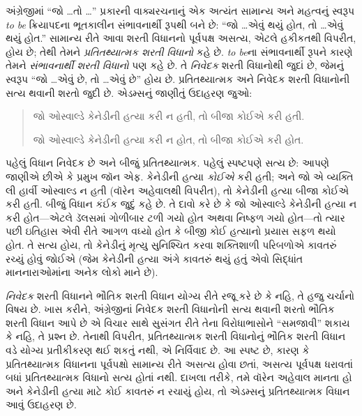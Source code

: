 \begingroup
\makeatletter{}\makeatother


\label{guunit:OLP-0521}


અંગ્રેજીમાં ``જો \dots તો \dots'' પ્રકારની વાક્યરચનાનું એક અત્યંત
સામાન્ય અને મહત્વનું સ્વરૂપ \emph{to be} ક્રિયાપદના ભૂતકાલીન
સંભાવનાર્થી રૂપથી બને છે: ``જો \dots એવું થયું હોત, તો \dots એવું
થયું હોત.'' સામાન્ય રીતે આવા શરતી વિધાનનો પૂર્વપક્ષ અસત્ય, એટલે
હકીકતથી વિપરીત, હોય છે; તેથી તેમને \emph{પ્રતિતથ્યાત્મક શરતી
  વિધાનો} કહે છે. \emph{to be}ના સંભાવનાર્થી રૂપને કારણે તેમને
\emph{સંભાવનાર્થી શરતી વિધાનો} પણ કહે છે. તે \emph{નિવેદક} શરતી
વિધાનોથી જુદાં છે, જેમનું સ્વરૂપ ``જો \dots એવું છે, તો \dots એવું
છે'' હોય છે. પ્રતિતથ્યાત્મક અને નિવેદક શરતી વિધાનોની સત્ય થવાની
શરતો જુદી છે. એડમ્સનું જાણીતું ઉદાહરણ જુઓ:
\begin{quote}
  જો ઓસ્વાલ્ડે કેનેડીની હત્યા કરી ન હતી, તો બીજા કોઈએ કરી હતી.
  
  જો ઓસ્વાલ્ડે કેનેડીની હત્યા કરી ન હોત, તો બીજા કોઈએ કરી હોત.
\end{quote}
પહેલું વિધાન નિવેદક છે અને બીજું પ્રતિતથ્યાત્મક. પહેલું સ્પષ્ટપણે
સત્ય છે: આપણે જાણીએ છીએ કે પ્રમુખ જૉન એફ. કેનેડીની હત્યા
\emph{કોઈએ} કરી હતી; અને જો એ વ્યક્તિ લી હાર્વી ઓસ્વાલ્ડ ન હતી
(વૉરેન અહેવાલથી વિપરીત), તો કેનેડીની હત્યા બીજા કોઈએ કરી હતી. બીજું
વિધાન કંઈક જુદું કહે છે. તે દાવો કરે છે કે જો ઓસ્વાલ્ડે કેનેડીની હત્યા
ન કરી હોત---એટલે ડૅલસમાં ગોળીબાર ટળી ગયો હોત અથવા નિષ્ફળ ગયો
હોત---તો ત્યાર પછી ઇતિહાસ એવી રીતે આગળ વધ્યો હોત કે બીજી કોઈ
હત્યાનો પ્રયાસ સફળ થયો હોત. તે સત્ય હોય, તો કેનેડીનું મૃત્યુ
સુનિશ્ચિત કરવા શક્તિશાળી પરિબળોએ કાવતરું રચ્યું હોવું જોઈએ (જેમ
કેનેડીની હત્યા અંગે કાવતરું થયું હતું એવો સિદ્ધાંત માનનારાઓમાંના
અનેક લોકો માને છે).

\emph{નિવેદક} શરતી વિધાનને ભૌતિક શરતી વિધાન યોગ્ય રીતે રજૂ કરે છે
કે નહિ, તે હજુ ચર્ચાનો વિષય છે. ખાસ કરીને, અંગ્રેજીનાં નિવેદક શરતી
વિધાનોની સત્ય થવાની શરતો ભૌતિક શરતી વિધાન આપે છે એ વિચાર સાથે
સુસંગત રીતે તેના વિરોધાભાસોને ``સમજાવી'' શકાય કે નહિ, તે પ્રશ્ન છે.
તેનાથી વિપરીત, પ્રતિતથ્યાત્મક શરતી વિધાનોનું ભૌતિક શરતી વિધાન વડે
યોગ્ય પ્રતીકીકરણ થઈ શકતું નથી, એ નિર્વિવાદ છે. આ સ્પષ્ટ છે, કારણ કે
પ્રતિતથ્યાત્મક વિધાનના પૂર્વપક્ષો સામાન્ય રીતે અસત્ય હોવા છતાં,
અસત્ય પૂર્વપક્ષ ધરાવતાં બધાં પ્રતિતથ્યાત્મક વિધાનો સત્ય હોતાં નથી.
દાખલા તરીકે, તમે વૉરેન અહેવાલ માનતા હો અને કેનેડીની હત્યા માટે કોઈ
કાવતરું ન રચાયું હોય, તો એડમ્સનું પ્રતિતથ્યાત્મક
વિધાન આવું ઉદાહરણ છે.

